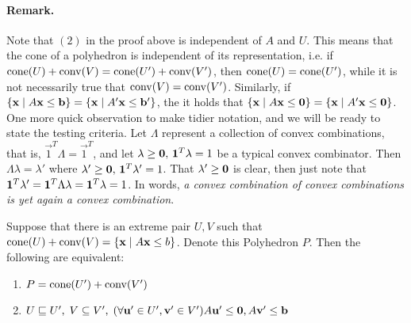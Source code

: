\paragraph{Remark.}  Note that $(2)$ in the proof above is independent of $A$ and $U$.  This means that the cone of a polyhedron is independent of its representation, i.e. if $\operatorname{cone}(U) + \operatorname{conv}(V) = \operatorname{cone}(U') + \operatorname{conv}(V')$, then $\operatorname{cone}(U) = \operatorname{cone}(U')$, while it is not necessarily true that $\operatorname{conv}(V) = \operatorname{conv}(V')$.  Similarly, if $\left\{\mathbf{x}\;|\; A\mathbf{x}\leq \mathbf{b}\right\} = \left\{\mathbf{x}\;|\; A'\mathbf{x}\leq \mathbf{b}'\right\}$, the it holds that $\left\{\mathbf{x}\;|\; A\mathbf{x}\leq\mathbf{0}\right\} = \left\{\mathbf{x}\;|\; A'\mathbf{x}\leq\mathbf{0}\right\}$.\\

One more quick observation to make tidier notation, and we will be ready to state the testing criteria.  Let $\Lambda$ represent a collection of convex combinations, that is, $\vec{1}^T\Lambda = \vec{1}^T$, and let $\lambda\geq\mathbf{0},\,\mathbf{1}^T\lambda = 1$ be a typical convex combinator.  Then $\Lambda\lambda = \lambda'$ where $\lambda'\geq\mathbf{0},\,\mathbf{1}^T\lambda'=1$.  That $\lambda'\geq\mathbf{0}$ is clear, then just note that $\mathbf{1}^T\lambda' = \mathbf{1}^T\Lambda\lambda = \mathbf{1}^T\lambda = 1$.  In words, \textit{a convex combination of convex combinations is yet again a convex combination}.

\begin{Prop}{\label{prop:hpolytest}
		Suppose that there is an extreme pair $U,V$ such that $\operatorname{cone}(U) + \operatorname{conv}(V) = \left\{\mathbf{x}\;|\; A\mathbf{x}\leq b\right\}$.  Denote this Polyhedron $P$.  Then the following are equivalent:
		\begin{enumerate}
			\item $P = \operatorname{cone}(U') + \operatorname{conv}(V')$
			\item $U \sqsubseteq U',\; V \subseteq V',\;
				      (\forall \mathbf{u}'\in U',\mathbf{v}'\in V') A\mathbf{u}'\leq\mathbf{0}, A\mathbf{v}'\leq\mathbf{b}$
		\end{enumerate}
	}\end{Prop}

